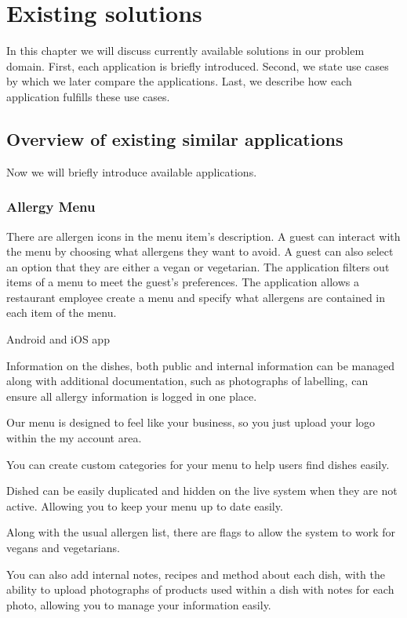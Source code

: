\chapter{Existing solutions}
In this chapter we will discuss currently available solutions in our problem domain.
First, each application is briefly introduced.
Second, we state use cases by which we later compare the applications.
Last, we describe how each application fulfills these use cases.

\section{Overview of existing similar applications}
Now we will briefly introduce available applications.

\subsection*{Allergy Menu}
There are allergen icons in the menu item's description.
A guest can interact with the menu by choosing what allergens they want to avoid.
A guest can also select an option that they are either a vegan or vegetarian.
The application filters out items of a menu to meet the guest's preferences.
The application allows a restaurant employee create a menu and specify what allergens are contained in each item of the menu.

Android and iOS app

Information on the dishes, both public and internal information can be managed along with additional documentation, such as photographs of labelling, can ensure all allergy information is logged in one place.

Our menu is designed to feel like your business, so you just upload your logo within the my account area.

You can create custom categories for your menu to help users find dishes easily.

Dished can be easily duplicated and hidden on the live system when they are not active. Allowing you to keep your menu up to date easily.

Along with the usual allergen list, there are flags to allow the system to work for vegans and vegetarians.

You can also add internal notes, recipes and method about each dish, with the ability to upload photographs of products used within a dish with notes for each photo, allowing you to manage your information easily.

